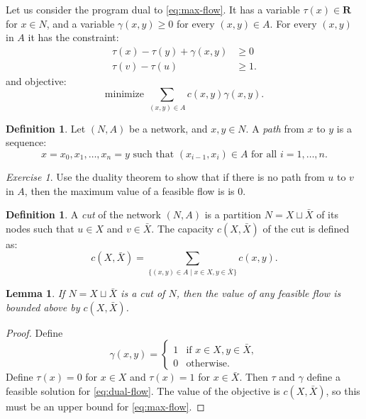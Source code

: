 \documentclass{amsbook}
\newcommand{\RR}{\mathbf R}
\newtheorem{lemma}[theorem]{Lemma}
\theoremstyle{definition}
\newtheorem{definition}[theorem]{Definition}
\theoremstyle{remark}
\newtheorem{exercise}[theorem]{Exercise}
\begin{document}
Let us consider the program dual to \eqref{eq:max-flow}.
It has a variable $\tau(x)\in \RR$ for $x\in N$, and a variable $\gamma(x,y)\geq 0$ for every $(x,y)\in A$.
For every $(x,y)$ in $A$ it has the constraint:
\begin{equation}
  \tag{DF}
  \label{eq:dual-flow}
  \begin{array}{rl}
    \tau(x)-\tau(y)+\gamma(x,y) & \geq 0 \\
    \tau(v)-\tau(u)& \geq 1.
  \end{array}
\end{equation}
and objective:
\begin{displaymath}
  \text{minimize } \sum_{(x,y)\in A} c(x,y)\gamma(x,y).
\end{displaymath}
\begin{definition}
  Let $(N,A)$ be a network, and $x,y\in N$.
  A \emph{path} from $x$ to $y$ is a sequence:
  \begin{displaymath}
    x=x_0,x_1,\dotsc,x_n=y \text{ such that } (x_{i-1},x_i)\in A \text{ for all }i=1,\dotsc,n.
  \end{displaymath}
\end{definition}
\begin{exercise}
  Use the duality theorem to show that if there is no path from $u$ to $v$ in $A$, then the maximum value of a feasible flow is is $0$.
\end{exercise}
\begin{definition}
  A \emph{cut} of the network $(N,A)$ is a partition $N=X\sqcup \bar X$ of its nodes such that $u\in X$ and $v\in \bar X$.
  The capacity $c(X,\bar X)$ of the cut is defined as:
  \begin{displaymath}
    c(X,\bar X) = \sum_{\{(x,y)\in A\mid x\in X,y\in \bar X\}} c(x,y).
  \end{displaymath}
\end{definition}
\begin{lemma}
  If $N=X\sqcup \bar X$ is a cut of $N$, then the value of any feasible flow is bounded above by $c(X,\bar X)$.
\end{lemma}
\begin{proof}
  Define
  \begin{displaymath}
    \gamma(x,y)=
    \begin{cases}
      1 & \text{if } x\in X,y\in \bar X,\\
      0 & \text{otherwise}.
    \end{cases}
  \end{displaymath}
  Define $\tau(x)=0$ for $x\in X$ and $\tau(x)=1$ for $x\in \bar X$.
  Then $\tau$ and $\gamma$ define a feasible solution for \eqref{eq:dual-flow}.
  The value of the objective is $c(X,\bar X)$, so this must be an upper bound for \eqref{eq:max-flow}.
\end{proof}
\end{document}
